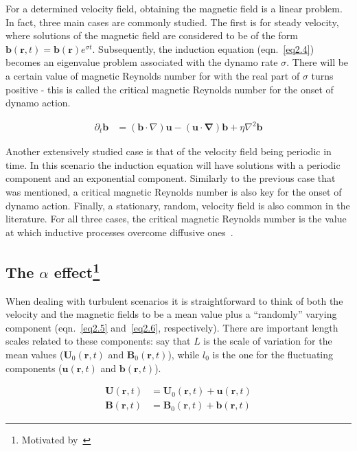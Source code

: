 \documentclass[a4paper,12pt]{article}
\begin{document}
For a determined velocity field, obtaining the magnetic field is a linear problem. In fact, three main cases are commonly studied. The first is for steady velocity, where solutions of the magnetic field are considered to be of the form $\bm b(\bm r, t) = \bm b(\bm r) e^{\sigma t}$. Subsequently, the induction equation (eqn.~\ref{eq2.4}) becomes an eigenvalue problem associated with the dynamo rate $\sigma$. There will be a certain value of magnetic Reynolds number for with the real part of $\sigma$ turns positive - this is called the critical magnetic Reynolds number for the onset of dynamo action. 

\begin{align}
\partial_t \bm b &= (\bm b \cdot \nabla) \bm u - (\bm u \cdot \bm \nabla) \bm b + \eta \nabla^2 \bm b \label{eq2.4}
\end{align}

Another extensively studied case is that of the velocity field being periodic in time. In this scenario the induction equation will have solutions with a periodic component and an exponential component. Similarly to the previous case that was mentioned, a critical magnetic Reynolds number is also key for the onset of dynamo action. Finally, a stationary, random, velocity field is also common in the literature. For all three cases, the critical magnetic Reynolds number is the value at which inductive processes overcome diffusive ones~\cite{tobias2011mhd}.
 
\subsection{The $\alpha$ effect\protect\footnote{Motivated by~\cite{schnack2009lectures}}}

When dealing with turbulent scenarios it is straightforward to think of both the velocity and the magnetic fields to be a mean value plus a ``randomly'' varying component (eqn.~\ref{eq2.5} and~\ref{eq2.6}, respectively). There are important length scales related to these components: say that $L$ is the scale of variation for the mean values ($\bm U_0(\bm r, t)$ and $\bm B_0(\bm r, t)$), while $l_0$ is the one for the fluctuating components ($\bm u(\bm r, t)$ and $\bm b(\bm r, t)$).

\begin{align}
 \bm U(\bm r, t) &= \bm U_0(\bm r, t) + \bm u(\bm r, t) \label{eq2.5} \\
 \bm B(\bm r, t) &= \bm B_0(\bm r, t) + \bm b(\bm r, t) \label{eq2.6}
\end{align}
\end{document}

